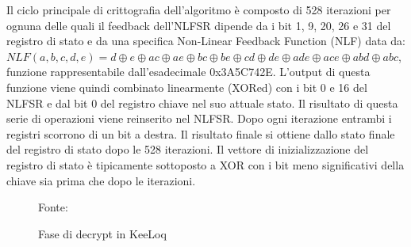 Il ciclo principale di crittografia dell’algoritmo è composto di 528 iterazioni per ognuna delle quali il feedback dell’NLFSR dipende da i bit 1, 9, 20, 26 e 31 del registro di stato e da una specifica Non-Linear Feedback Function (NLF) data da: \(NLF(a, b, c, d, e) = d \oplus e \oplus ac \oplus ae \oplus bc \oplus be \oplus cd \oplus de \oplus ade \oplus ace \oplus abd \oplus abc\), funzione rappresentabile dall’esadecimale 0x3A5C742E. L’output di questa funzione viene quindi combinato linearmente (XORed) con i bit 0 e 16 del NLFSR e dal bit 0 del registro chiave nel suo attuale stato. Il risultato di questa serie di operazioni viene reinserito nel NLFSR. Dopo ogni iterazione entrambi i registri scorrono di un bit a destra. Il risultato finale si ottiene dallo stato finale del registro di stato dopo le 528 iterazioni. Il vettore di inizializzazione del registro di stato è tipicamente sottoposto a XOR con i bit meno significativi della chiave sia prima che dopo le iterazioni.\\

\begin{figure} %
  \centering
  \def\stackalignment{r} %
  {\scriptsize \parbox[position]{\linewidth}{ Fonte: \cite{keeloqwiki}} }
  \caption{Fase di decrypt in KeeLoq}
  \label{fig:keeloq_decrypt}
\end{figure}

